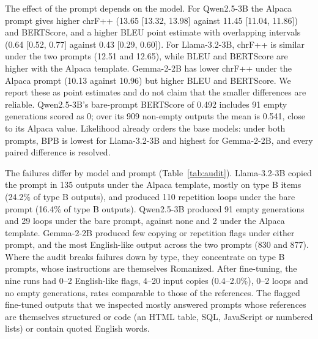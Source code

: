 \documentclass{article}
\begin{document}
The effect of the prompt depends on the model. For Qwen2.5-3B the Alpaca prompt gives higher chrF++ (13.65 [13.32, 13.98] against 11.45 [11.04, 11.86]) and BERTScore, and a higher BLEU point estimate with overlapping intervals (0.64 [0.52, 0.77] against 0.43 [0.29, 0.60]). For Llama-3.2-3B, chrF++ is similar under the two prompts (12.51 and 12.65), while BLEU and BERTScore are higher with the Alpaca template. Gemma-2-2B has lower chrF++ under the Alpaca prompt (10.13 against 10.96) but higher BLEU and BERTScore. We report these as point estimates and do not claim that the smaller differences are reliable. Qwen2.5-3B's bare-prompt BERTScore of 0.492 includes 91 empty generations scored as 0; over its 909 non-empty outputs the mean is 0.541, close to its Alpaca value. Likelihood already orders the base models: under both prompts, BPB is lowest for Llama-3.2-3B and highest for Gemma-2-2B, and every paired difference is resolved.

The failures differ by model and prompt (Table~\ref{tab:audit}). Llama-3.2-3B copied the prompt in 135 outputs under the Alpaca template, mostly on type B items (24.2\% of type B outputs), and produced 110 repetition loops under the bare prompt (16.4\% of type B outputs). Qwen2.5-3B produced 91 empty generations and 29 loops under the bare prompt, against none and 2 under the Alpaca template. Gemma-2-2B produced few copying or repetition flags under either prompt, and the most English-like output across the two prompts (830 and 877). Where the audit breaks failures down by type, they concentrate on type B prompts, whose instructions are themselves Romanized. After fine-tuning, the nine runs had 0–2 English-like flags, 4–20 input copies (0.4–2.0\%), 0–2 loops and no empty generations, rates comparable to those of the references. The flagged fine-tuned outputs that we inspected mostly answered prompts whose references are themselves structured or code (an HTML table, SQL, JavaScript or numbered lists) or contain quoted English words.
\end{document}
